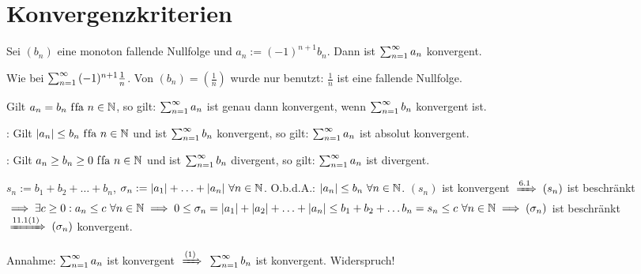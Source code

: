 \documentclass[a4paper,oneside,DIV15,BCOR12mm]{scrbook}
\begin{document}
\chapter{Konvergenzkriterien}

\begin{satz}[Leibnizkriterium]
Sei $(b_n)$ eine monoton fallende Nullfolge und $a_n := (-1)^{n+1}b_n$. Dann ist $\sum_{n=1}^{\infty}{a_n}$ konvergent.
\end{satz}
\begin{beweis}
Wie bei $\sum_{n=1}^{\infty}{(-1)^{n+1}\frac{1}{n}}$. Von $(b_n)=(\frac{1}{n})$ wurde nur benutzt: $\frac{1}{n}$ ist eine fallende Nullfolge.
\end{beweis}
\begin{bemerkung}
Gilt $a_n=b_n \text{ f\/fa } n\in\mathbb{N}$, so gilt: $\sum_{n=1}^{\infty}{a_n}$ ist genau dann konvergent, wenn $\sum_{n=1}^{\infty}{b_n}$ konvergent ist.
\end{bemerkung}

\begin{satz}
\begin{liste}
\item {}: Gilt $|a_n|\le b_n \text{ f\/fa } n\in\mathbb{N}$ und  ist $\sum_{n=1}^{\infty}{b_n}$ konvergent, so gilt: $\sum_{n=1}^{\infty}{a_n}$ ist absolut konvergent.
\item {}: Gilt $a_n\ge b_n \ge 0 \text{ f\/fa } n\in\mathbb{N}$ und  ist $\sum_{n=1}^{\infty}{b_n}$ divergent, so gilt: $\sum_{n=1}^{\infty}{a_n}$ ist divergent.
\end{liste}
\end{satz}

\begin{beweise}
\item $s_n := b_1 +b_2+ \ldots + b_n$, $\sigma_n := |a_1|+\ldots+|a_n| \ \forall n\in\mathbb{N}$. O.b.d.A.: $|a_n| \le b_n \ \forall n\in\MdN$. $(s_n)$ ist konvergent $\folgtnach{6.1} (s_n)$ ist beschränkt $\implies \exists c\ge0: a_n \le c \ \forall n\in\mathbb{N} \implies 0 \le \sigma_n = |a_1| + |a_2| + \ldots + |a_n| \le b_1 + b_2 + \ldots b_n = s_n \le c \ \forall n\in\mathbb{N} \implies (\sigma_n)$ ist beschränkt $\folgtnach{11.1(1)} (\sigma_n)$ konvergent.
\item Annahme: $\sum_{n=1}^{\infty}{a_n}$ ist konvergent $\folgtnach{(1)}$ $\sum_{n=1}^{\infty}{b_n}$ ist konvergent. Widerspruch!
\end{beweise}
\end{document}
